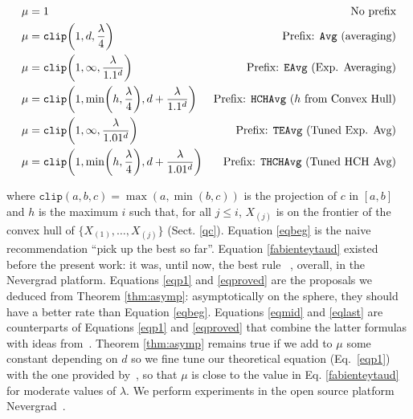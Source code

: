 \begin{figure}[t]
\end{figure}
\begin{footnotesize}
\begin{align}
    \mu & = 1 &\mbox{No prefix}\label{eqbeg} \\
    \mu & = \texttt{clip}\left(1, d,\frac{\lambda}{4}\right) &\mbox{Prefix: \texttt{Avg} (averaging)}\label{fabienteytaud}\\
    \mu & = \texttt{clip}\left(1, \infty, \frac{\lambda}{1.1^d}\right) &\mbox{Prefix: \texttt{EAvg} (Exp. Averaging)}\label{eqp1}\\
\mu & = \texttt{clip}\left(1, \min\left(h,\frac{\lambda}{4}\right), d+\frac{\lambda}{1.1^d}\right) &\mbox{Prefix: \texttt{HCHAvg} ($h$ from Convex Hull)}\label{eqmid}\\
    \mu & = \texttt{clip}\left(1, \infty, \frac{\lambda}{1.01^d}\right) &\mbox{Prefix: \texttt{TEAvg} (Tuned Exp. Avg)}\label{eqproved}\\
    \mu & = \texttt{clip}\left(1, \min\left(h,\frac{\lambda}{4}\right), d+\frac{\lambda}{1.01^d}\right) &\mbox{Prefix: \texttt{THCHAvg} (Tuned HCH Avg)}\label{eqlast}
\end{align}\end{footnotesize}
    where $\texttt{clip}(a,b,c)=\max(a,\min(b,c))$ is the projection of $c$ in $[a,b]$ and $h$ is the maximum $i$ such that, for all $j\leq i$, $X_{(j)}$ is on the frontier of the convex hull of $\{X_{(1)},\dots,X_{(j)}\}$ (Sect. \ref{qc}).
Equation \ref{eqbeg} is the naive recommendation ``pick up the best so far''.
Equation \ref{fabienteytaud} existed before the present work: it was, until now, the best rule~\cite{ratio} , overall, in the Nevergrad platform. Equations \ref{eqp1} and \ref{eqproved} are the proposals we deduced from Theorem \ref{thm:asymp}: asymptotically on the sphere, they should have a better rate than Equation \ref{eqbeg}.  Equations \ref{eqmid} and \ref{eqlast} are counterparts of Equations \ref{eqp1} and \ref{eqproved} that combine the latter formulas with ideas from~\cite{ratio}.
 Theorem \ref{thm:asymp} remains true if we add to $\mu$ some constant depending on $d$ so we fine tune our theoretical equation (Eq.~\ref{eqp1}) with the one provided by~\cite{ratio}, so that $\mu$ is close to
 the value in Eq. \ref{fabienteytaud} for moderate values of $\lambda$.
We perform experiments in the open source platform Nevergrad~\cite{nevergrad}.
